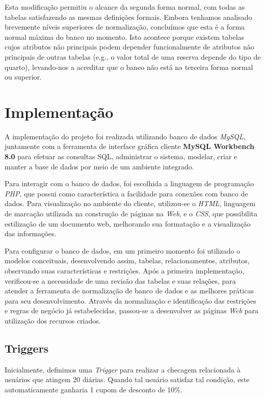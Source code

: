 \documentclass[a4paper, 12pt]{article}
\begin{document}
Esta modificação permitiu o alcance da segunda forma normal, com todas as tabelas satisfazendo as mesmas definições formais. Embora tenhamos analisado brevemente níveis superiores de normalização, concluímos que esta é a forma normal máxima do banco no momento. Isto acontece porque existem tabelas cujos atributos não principais podem depender funcionalmente de atributos não principais de outras tabelas (e.g., o valor total de uma reserva depende do tipo de quarto), levando-nos a acreditar que o banco não está na terceira forma normal ou superior.

\section{Implementação}

A implementação do projeto foi realizada utilizando banco de dados \emph{MySQL}, juntamente com a ferramenta de interface gráfica cliente \textbf{MySQL Workbench 8.0} para efetuar as consultas SQL, administrar o sistema, modelar, criar e manter a base de dados por meio de um ambiente integrado. 

Para interagir com o banco de dados, foi escolhida a linguagem de programação \emph{PHP}, que possui como característica a facilidade para conexões com banco de dados. Para visualização no ambiente do cliente, utilizou-se o \emph{HTML}, linguagem de marcação utilizada na construção de páginas na \emph{Web}, e o \emph{CSS}, que possibilita estilização de um documento web, melhorando sua formatação e a visualização das informações.

Para configurar o banco de dados, em um primeiro momento foi utilizado o modelos conceituais, desenvolvendo assim, tabelas, relacionamentos, atributos, observando suas características e restrições. Após a primeira implementação, verificou-se a necessidade de uma revisão das tabelas e suas relações, para atender a ferramenta de normalização de banco de dados e as melhores práticas para seu desenvolvimento. Através da normalização e identificação das restrições e regras de negócio já estabelecidas, passou-se a desenvolver as páginas \emph{Web} para utilização dos recursos criados.

\subsection{Triggers}

Inicialmente, definimos uma \emph{Trigger} para realizar a checagem relacionada à usuários que atingem 20 diárias. Quando tal usuário satisfaz tal condição, este automaticamente ganharia 1 cupom de desconto de 10\%.
\end{document}
